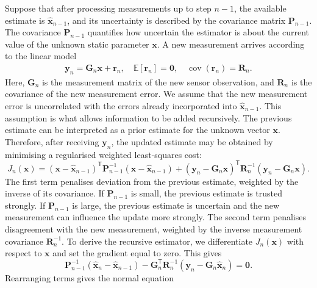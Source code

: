 \documentclass[graybox,envcountchap]{style/SNmono}
\begin{document}
Suppose that after processing measurements up to step $n-1$, the available estimate is $\widehat{\mathbf{x}}_{n-1}$, and its uncertainty is described by the covariance matrix $\mathbf{P}_{n-1}$. The covariance $\mathbf{P}_{n-1}$ quantifies how uncertain the estimator is about the current value of the unknown static parameter $\mathbf{x}$. A new measurement arrives according to the linear model
\begin{align*}
\mathbf{y}_n
=
\mathbf{G}_n\mathbf{x}
+
\mathbf{r}_n,
\quad
\mathbb{E}[\mathbf{r}_n]=\mathbf{0},
\quad
\operatorname{cov}(\mathbf{r}_n)=\mathbf{R}_n.
\end{align*}
Here, $\mathbf{G}_n$ is the measurement matrix of the new sensor observation, and $\mathbf{R}_n$ is the covariance of the new measurement error. We assume that the new measurement error is uncorrelated with the errors already incorporated into $\widehat{\mathbf{x}}_{n-1}$. This assumption is what allows information to be added recursively. The previous estimate can be interpreted as a prior estimate for the unknown vector $\mathbf{x}$. Therefore, after receiving $\mathbf{y}_n$, the updated estimate may be obtained by minimising a regularised weighted least-squares cost:
\begin{equation}
J_n(\mathbf{x}) = \left( \mathbf{x} - \widehat{\mathbf{x}}_{n-1} \right)^{\mathsf T} \mathbf{P}_{n-1}^{-1} \left( \mathbf{x} - \widehat{\mathbf{x}}_{n-1} \right) + \left( \mathbf{y}_n - \mathbf{G}_n\mathbf{x} \right)^{\mathsf T} \mathbf{R}_n^{-1} \left( \mathbf{y}_n - \mathbf{G}_n\mathbf{x} \right).
\end{equation}
The first term penalises deviation from the previous estimate, weighted by the inverse of its covariance. If $\mathbf{P}_{n-1}$ is small, the previous estimate is trusted strongly. If $\mathbf{P}_{n-1}$ is large, the previous estimate is uncertain and the new measurement can influence the update more strongly. The second term penalises disagreement with the new measurement, weighted by the inverse measurement covariance $\mathbf{R}_n^{-1}$. To derive the recursive estimator, we differentiate $J_n(\mathbf{x})$ with respect to $\mathbf{x}$ and set the gradient equal to zero. This gives
\begin{equation}
\mathbf{P}_{n-1}^{-1}
\left(
\widehat{\mathbf{x}}_n
-
\widehat{\mathbf{x}}_{n-1}
\right)
-
\mathbf{G}_n^{\mathsf T}
\mathbf{R}_n^{-1}
\left(
\mathbf{y}_n
-
\mathbf{G}_n
\widehat{\mathbf{x}}_n
\right)
=
\mathbf{0}.
\end{equation}
Rearranging terms gives the normal equation
\end{document}
